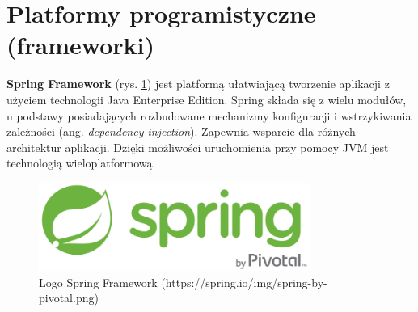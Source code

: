 \section{Platformy programistyczne (frameworki)}
\textbf{Spring Framework} (rys. \ref{spring_logo}) jest platformą ułatwiającą tworzenie aplikacji z użyciem technologii Java Enterprise Edition. Spring składa się z wielu modułów, u podstawy posiadających rozbudowane mechanizmy konfiguracji i wstrzykiwania zależności (ang. \textit{dependency injection}). Zapewnia wsparcie dla różnych architektur aplikacji.\cite{spring} Dzięki możliwości uruchomienia przy pomocy JVM jest technologią wieloplatformową.
\begin{figure}[!ht]
	\begin{center}
		\includegraphics[width=3.5in]{img/logo/spring.png}
		\caption{Logo Spring Framework (https://spring.io/img/spring-by-pivotal.png)}
		\label{spring_logo}
	\end{center}
\end{figure}

